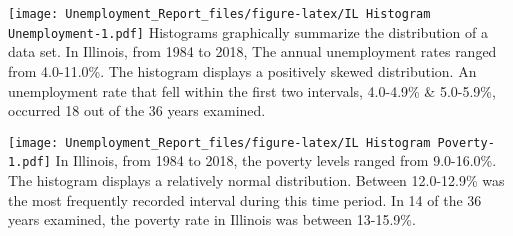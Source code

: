 \documentclass[
]{article}
\newenvironment{Shaded}{\begin{snugshade}}{\end{snugshade}}
\newcommand{\DataTypeTok}[1]{\textcolor[rgb]{0.13,0.29,0.53}{#1}}
\newcommand{\DecValTok}[1]{\textcolor[rgb]{0.00,0.00,0.81}{#1}}
\newcommand{\KeywordTok}[1]{\textcolor[rgb]{0.13,0.29,0.53}{\textbf{#1}}}
\newcommand{\NormalTok}[1]{#1}
\newcommand{\OperatorTok}[1]{\textcolor[rgb]{0.81,0.36,0.00}{\textbf{#1}}}
\newcommand{\StringTok}[1]{\textcolor[rgb]{0.31,0.60,0.02}{#1}}
\begin{document}
\begin{Shaded}
\end{Shaded}

\texttt{[image: Unemployment\_Report\_files/figure-latex/IL Histogram Unemployment-1.pdf]}
Histograms graphically summarize the distribution of a data set. In
Illinois, from 1984 to 2018, The annual unemployment rates ranged from
4.0-11.0\%. The histogram displays a positively skewed distribution. An
unemployment rate that fell within the first two intervals, 4.0-4.9\% \&
5.0-5.9\%, occurred 18 out of the 36 years examined.

\begin{Shaded}
\end{Shaded}

\texttt{[image: Unemployment\_Report\_files/figure-latex/IL Histogram Poverty-1.pdf]}
In Illinois, from 1984 to 2018, the poverty levels ranged from
9.0-16.0\%. The histogram displays a relatively normal distribution.
Between 12.0-12.9\% was the most frequently recorded interval during
this time period. In 14 of the 36 years examined, the poverty rate in
Illinois was between 13-15.9\%.

\begin{Shaded}
\end{Shaded}
\end{document}
